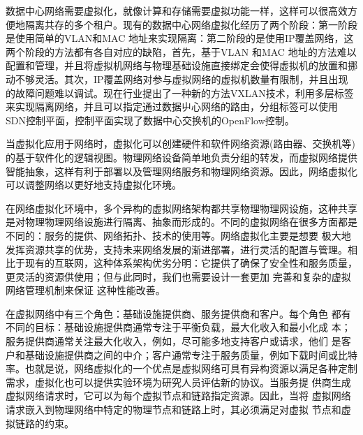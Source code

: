 数据中心网络需要虚拟化，就像计算和存储需要虚拟功能一样，这样可以很高效方便地隔离共存的多个租户。现有的数据中心网络虚拟化经历了两个阶段：第一阶段是使用简单的VLAN和MAC 地址来实现隔离：第二阶段的是使用IP覆盖网络，这两个阶段的方法都有各自对应的缺陷，首先，基于VLAN 和MAC 地址的方法难以配置和管理，并且将虚拟机网络与物理基础设施直接绑定会使得虚拟机的放置和挪动不够灵活。其次，IP覆盖网络对参与虚拟网络的虚拟机数量有限制，并且出现的故障问题难以调试。现在行业提出了一种新的方法VXLAN技术，利用多层标签来实现隔离网络，并且可以指定通过数据屮心网络的路由，分组标签可以使用SDN控制平面，控制平面实现了数据中心交换机的OpenFlow控制。


当虚拟化应用于网络时，虚拟化可以创建硬件和软件网络资源(路由器、交换机等)的基于软件化的逻辑视图。物理网络设备简单地负责分组的转发，而虚拟网络提供智能抽象，这样有利于部署以及管理网络服务和物理网络资源。因此，网络虚拟化可以调整网络以更好地支持虚拟化环境。


在网络虚拟化环境中，多个异构的虚拟网络架构都共享物理物理网设施，这种共享是对物理物理网络设施进行隔离、抽象而形成的。不同的虚拟网络在很多方面都是不同的：服务的提供、网络拓扑、技术的使用等。网络虚拟化主要是想要 极大地发挥资源共享的优势，支持未来网络发展的渐进部署，进行灵活的配置与管理。相比于现有的互联网，这种体系架构优劣分明：它提供了确保了安全性和服务质量，更灵活的资源供使用；但与此同时，我们也需要设计一套更加 完善和复杂的虚拟网络管理机制来保证 这种性能改善。

在虚拟网络中有三个角色：基础设施提供商、服务提供商和客户。每个角色 都有不同的目标：基础设施提供商通常专注于平衡负载，最大化收入和最小化成 本；服务提供商通常关注最大化收入，例如，尽可能多地支持客户或请求，他们 是客户和基础设施提供商之间的中介；客户通常专注于服务质量，例如下载时间或比特率。也就是说，网络虚拟化的一个优点是虚拟网络可具有异构资源以满足各种定制需求，虚拟化也可以提供实验环境为研究人员评估新的协议。当服务提 供商生成虚拟网络请求时，它可以为每个虚拟节点和链路指定资源。因此，当将 虚拟网络请求嵌入到物理网络中特定的物理节点和链路上时，其必须满足对虚拟 节点和虚拟链路的约束。


